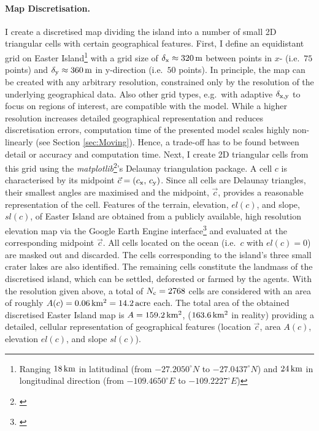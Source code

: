 \paragraph{Map Discretisation.}
I create a discretised map dividing the island into a number of small 2D triangular cells with certain geographical features.
First, I define an equidistant grid on Easter Island\footnote{Ranging $18\, {\rm km}$ in latitudinal (from $-27.2050^\circ N$ to $-27.0437^\circ N$) and $24\, {\rm km}$ in longitudinal direction (from  $-109.4650^\circ E$ to 
 $-109.2227^\circ E$)} with a grid size of $\delta_{\rm x} \approx 320\, {\rm m}$ between points in $x$- (i.e.\ $75$ points) and $\delta_{\rm y} \approx 360\, {\rm m}$ in y-direction (i.e.\ $50$ points). 
In principle, the map can be created with any arbitrary resolution, constrained only by the resolution of the underlying geographical data. 
Also other grid types, e.g.\ with adaptive $\delta_{\rm x,y}$ to focus on regions of interest, are compatible with the model. 
While a higher resolution increases detailed geographical representation and reduces discretisation errors, computation time of the presented model scales highly non-linearly (see Section \ref{sec:Moving}).
Hence, a trade-off has to be found between detail or accuracy and computation time.
Next, I create 2D triangular cells from this grid using the  \textit{matplotlib}\footnote{\citet{matplotlib}}'s Delaunay triangulation package.
A cell $c$ is characterised by its midpoint $\vec{c} = (c_{\rm x},\, c_{\rm y})$. 
Since all cells are Delaunay triangles, their smallest angles are maximised and the midpoint, $\vec{c}$, provides a reasonable representation of the cell.
Features of the terrain, elevation, $el(c)$, and slope, $sl(c)$, of Easter Island are obtained from a publicly available, high resolution elevation map \citep{Jarvis2008CIGAR} via the Google Earth Engine interface\footnote{\citet{gorelick2017google}} and evaluated at the corresponding midpoint $\vec{c}$.
All cells located on the ocean (i.e.\ $c$ with $el(c)=0$) are masked out and discarded.
The cells corresponding to the island's three small crater lakes are also identified.
The remaining cells constitute the landmass of the discretised island, which can be settled, deforested or farmed by the agents. 
With the resolution given above, a total of $N_{\rm c} = 2768$ cells are considered with an area of roughly $A(c)= 0.06 \, {\rm km^2} = 14.2 \, {\rm acre}$ each.
The total area of the obtained discretised Easter Island map is $A=159.2\, {\rm km^2}$, ($163.6\, {\rm km^2}$ in reality) providing a detailed, cellular representation of geographical features (location $\vec{c}$, area $A(c)$, elevation $el(c)$, and slope $sl(c)$).

